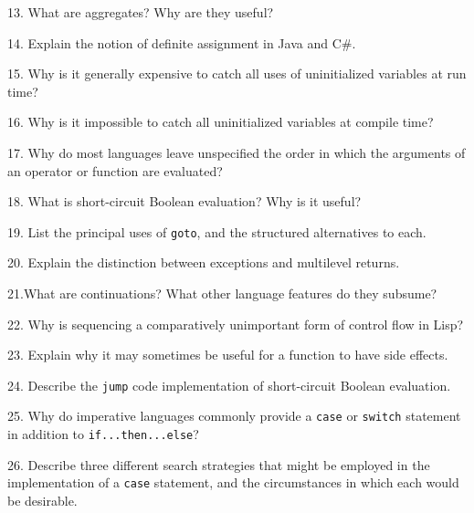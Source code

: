 13. What are aggregates? Why are they useful?

\filbreak
\vskip 1cm

14. Explain the notion of definite assignment in Java and C$\#$.

\filbreak
\vskip 1cm

15. Why is it generally expensive to catch all uses of uninitialized variables at run time?

\filbreak
\vskip 1cm

16. Why is it impossible to catch all uninitialized variables at compile time?

\filbreak
\vskip 1cm

17. Why do most languages leave unspecified the order in which the arguments of an operator or function are evaluated?

\filbreak
\vskip 1cm

18. What is short-circuit Boolean evaluation? Why is it useful?

\filbreak
\vskip 1cm

19. List the principal uses of {\tt goto}, and the structured alternatives to each.

\filbreak
\vskip 1cm

20. Explain the distinction between exceptions and multilevel returns.

\filbreak
\vskip 1cm

21.What are continuations? What other language features do they subsume?

\filbreak
\vskip 1cm

22.  Why is sequencing a comparatively unimportant form of control flow in Lisp?

\filbreak
\vskip 1cm

23. Explain why it may sometimes be useful for a function to have side effects.

\filbreak
\vskip 1cm

24. Describe the {\tt jump} code implementation of short-circuit Boolean evaluation.

\filbreak
\vskip 1cm

25. Why do imperative languages commonly provide a {\tt case} or {\tt switch} statement in addition to {\tt if...then...else}?

\filbreak
\vskip 1cm

26. Describe three different search strategies that might be employed in the implementation of a {\tt case} statement, and the circumstances in which each would be desirable.

